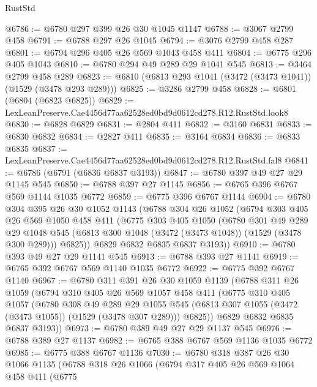 \begin{lexlean}{RustStd}
\begin{coremodule}
@6786 := @6780 @297 @399 @26 @30 @1045 @1147
@6788 := @3067 @2799 @458
@6791 := @6788 @297 @26 @1045
@6794 := @3076 @2799 @458 @287
@6801 := @6794 @296 @405 @26 @569 @1043 @458 @411
@6804 := @6775 @296 @405 @1043
@6810 := @6780 @294 @49 @289 @29 @1041 @545
@6813 := @3464 @2799 @458 @289
@6823 := @6810 (@6813 @293 @1041 (@3472 (@3473 @1041)) (@1529 (@3478 @293 @289)))
@6825 := @3286 @2799 @458
@6828 := @6801 (@6804 (@6823 @6825))
@6829 := LexLeanPreserve.Cae4456d77aa62528ed0bd9d0612cd278.R12.RustStd.look8
@6830 := @6828 @6829
@6831 := @2804 @411
@6832 := @3160 @6831
@6833 := @6830 @6832
@6834 := @2827 @411
@6835 := @3164 @6834
@6836 := @6833 @6835
@6837 := LexLeanPreserve.Cae4456d77aa62528ed0bd9d0612cd278.R12.RustStd.fal8
@6841 := @6786 (@6791 (@6836 @6837 @3193))
@6847 := @6780 @397 @49 @27 @29 @1145 @545
@6850 := @6788 @397 @27 @1145
@6856 := @6765 @396 @6767 @569 @1144 @1035 @6772
@6859 := @6775 @396 @6767 @1144
@6904 := @6780
    @304
    @395
    @26
    @30
    @1052
    @1143
    (@6788
      @304
      @26
      @1052
      (@6794
        @303
        @405
        @26
        @569
        @1050
        @458
        @411
        (@6775
          @303
          @405
          @1050
          (@6780
            @301
            @49
            @289
            @29
            @1048
            @545
            (@6813 @300 @1048 (@3472 (@3473 @1048)) (@1529 (@3478 @300 @289)))
            @6825))
        @6829
        @6832
        @6835
        @6837
        @3193))
@6910 := @6780 @393 @49 @27 @29 @1141 @545
@6913 := @6788 @393 @27 @1141
@6919 := @6765 @392 @6767 @569 @1140 @1035 @6772
@6922 := @6775 @392 @6767 @1140
@6967 := @6780
    @311
    @391
    @26
    @30
    @1059
    @1139
    (@6788
      @311
      @26
      @1059
      (@6794
        @310
        @405
        @26
        @569
        @1057
        @458
        @411
        (@6775
          @310
          @405
          @1057
          (@6780
            @308
            @49
            @289
            @29
            @1055
            @545
            (@6813 @307 @1055 (@3472 (@3473 @1055)) (@1529 (@3478 @307 @289)))
            @6825))
        @6829
        @6832
        @6835
        @6837
        @3193))
@6973 := @6780 @389 @49 @27 @29 @1137 @545
@6976 := @6788 @389 @27 @1137
@6982 := @6765 @388 @6767 @569 @1136 @1035 @6772
@6985 := @6775 @388 @6767 @1136
@7030 := @6780
    @318
    @387
    @26
    @30
    @1066
    @1135
    (@6788
      @318
      @26
      @1066
      (@6794
        @317
        @405
        @26
        @569
        @1064
        @458
        @411
        (@6775

\end{coremodule}
\end{lexlean}
